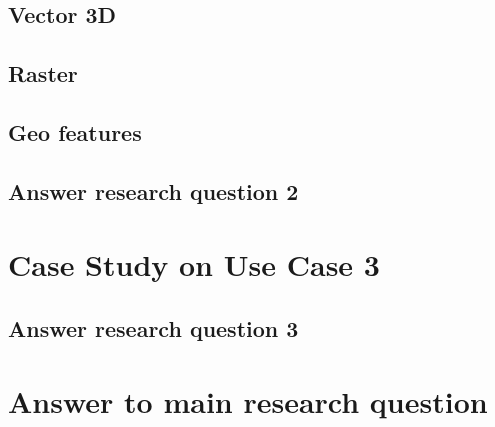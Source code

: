 \subsection{Vector 3D}

\subsection{Raster}

\subsection{Geo features}

\subsection*{Answer research question 2}

\section{Case Study on Use Case 3}%

\subsection*{Answer research question 3}

\section{Answer to main research question}







